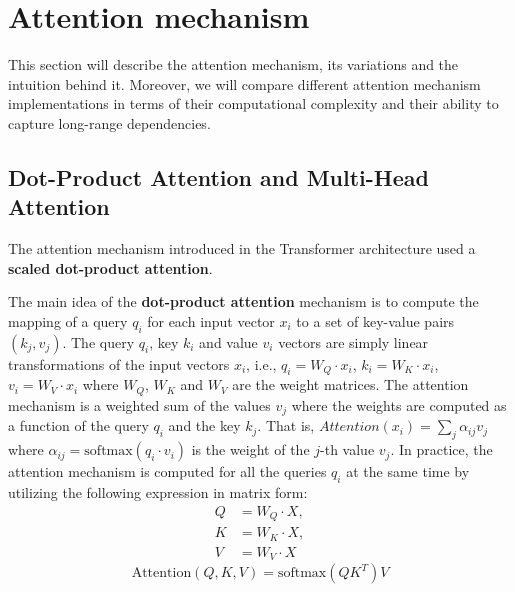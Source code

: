 \documentclass[a4paper, twoside]{report}
\theoremstyle{definition}
\numberwithin{equation}{section}
\begin{document}
\section{Attention mechanism} \label{sec:attention_mechanism}

This section will describe the attention mechanism, its variations and the intuition behind it.
Moreover, we will compare different attention mechanism implementations in terms of
their computational complexity and their ability to capture long-range dependencies.

\subsection{Dot-Product Attention and Multi-Head Attention} \label{sec:dot_product_attention}


The attention mechanism introduced in the Transformer architecture \cite{1706.03762} used a \textbf{scaled dot-product attention}.


The main idea of the \textbf{dot-product attention} mechanism is to compute the mapping of a query $q_i$ for each input vector $x_i$ to a set of key-value pairs $(k_j, v_j)$.
The query $q_i$, key $k_i$ and value $v_i$ vectors are simply linear transformations of the input vectors $x_i$,
i.e., $q_i=W_Q\cdot x_i$, $k_i=W_K\cdot x_i$, $v_i=W_V\cdot x_i$ where $W_Q$, $W_K$ and $W_V$ are the weight matrices.
The attention mechanism is a weighted sum of the values $v_j$ where the weights are computed as a function of the query $q_i$ and the key $k_j$.
That is, $Attention(x_i)=\sum_j \alpha_{ij} v_j$ where $\alpha_{ij}=\text{softmax}(q_i \cdot v_i)$ is the weight of the $j$-th value $v_j$.
In practice, the attention mechanism is computed for all the queries $q_i$ at the same time by utilizing the following expression in matrix form:
\begin{equation}
    \begin{array}{rll}
        Q & = W_Q \cdot X, \\
        K & = W_K \cdot X, \\
        V & = W_V \cdot X
    \end{array}
\end{equation}
\begin{equation}\label{eq:dot_product_attention_matrix}
    \text{Attention}(Q, K, V)=\text{softmax}(Q K^T) V
\end{equation}
\end{document}
